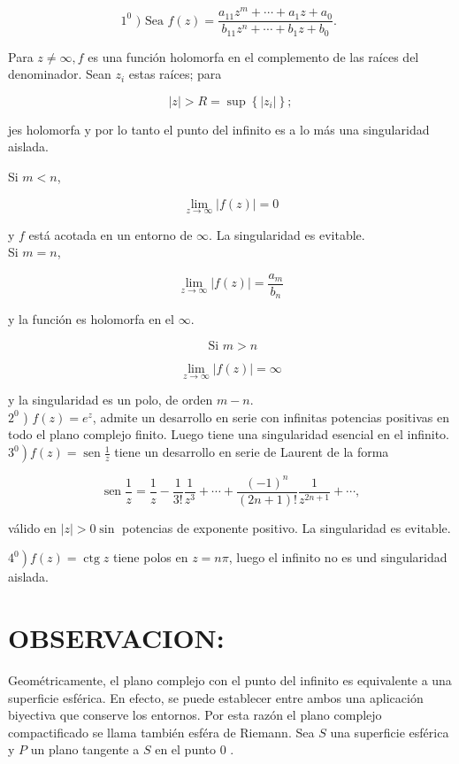 \documentclass[10pt]{article}
\theoremstyle{plain}
\theoremstyle{definition}
\theoremstyle{remark}
\begin{document}
$$
1^{0} \text { ) Sea } f(z)=\frac{a_{11} z^{m}+\cdots+a_{1} z+a_{0}}{b_{11} z^{n}+\cdots+b_{1} z+b_{0}} \text {. }
$$

Para $z \neq \infty, f$ es una función holomorfa en el complemento de las raíces del denominador. Sean $z_{i}$ estas raíces; para

$$
|z|>R=\sup \left\{\left|z_{i}\right|\right\} ;
$$

jes holomorfa y por lo tanto el punto del infinito es a lo más una singularidad aislada.

Si $m<n$,

$$
\lim _{z \rightarrow \infty}|f(z)|=0
$$

y $f$ está acotada en un entorno de $\infty$. La singularidad es evitable.\\
Si $m=n$,

$$
\lim _{z \rightarrow \infty}|f(z)|=\frac{a_{m}}{b_{n}}
$$

y la función es holomorfa en el $\infty$.

$$
\text { Si } m>n
$$

$$
\lim _{z \rightarrow \infty}|f(z)|=\infty
$$

y la singularidad es un polo, de orden $m-n$.\\
$2^{0}$ ) $f(z)=e^{z}$, admite un desarrollo en serie con infinitas potencias positivas en todo el plano complejo finito. Luego tiene una singularidad esencial en el infinito.\\
$\left.3^{0}\right) f(z)=\operatorname{sen} \frac{1}{z}$ tiene un desarrollo en serie de Laurent de la forma

$$
\operatorname{sen} \frac{1}{z}=\frac{1}{z}-\frac{1}{3!} \frac{1}{z^{3}}+\cdots+\frac{(-1)^{n}}{(2 n+1)!} \frac{1}{z^{2 n+1}}+\cdots,
$$

válido en $|z|>0 \sin$ potencias de exponente positivo. La singularidad es evitable.


$\left.4^{0}\right) f(z)=\operatorname{ctg} z$ tiene polos en $z=n \pi$, luego el infinito no es und singularidad aislada.

\section*{OBSERVACION:}
Geométricamente, el plano complejo con el punto del infinito es equivalente a una superficie esférica. En efecto, se puede establecer entre ambos una aplicación biyectiva que conserve los entornos. Por esta razón el plano complejo compactificado se llama también esféra de Riemann. Sea $S$ una superficie esférica y $P$ un plano tangente a $S$ en el punto 0 .
\end{document}
